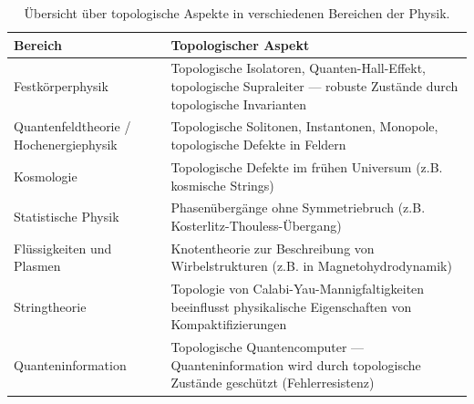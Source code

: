 \begin{table}[h]
    \centering
    \begin{tabular}{|l|p{10cm}|}
        \hline
        \textbf{Bereich} & \textbf{Topologischer Aspekt} \\
        \hline
        Festkörperphysik & Topologische Isolatoren, Quanten-Hall-Effekt, topologische Supraleiter — robuste Zustände durch topologische Invarianten \\
        \hline
        Quantenfeldtheorie / Hochenergiephysik & Topologische Solitonen, Instantonen, Monopole, topologische Defekte in Feldern \\
        \hline
        Kosmologie & Topologische Defekte im frühen Universum (z.B. kosmische Strings) \\
        \hline
        Statistische Physik & Phasenübergänge ohne Symmetriebruch (z.B. Kosterlitz-Thouless-Übergang) \\
        \hline
        Flüssigkeiten und Plasmen & Knotentheorie zur Beschreibung von Wirbelstrukturen (z.B. in Magnetohydrodynamik) \\
        \hline
        Stringtheorie & Topologie von Calabi-Yau-Mannigfaltigkeiten beeinflusst physikalische Eigenschaften von Kompaktifizierungen \\
        \hline
        Quanteninformation & Topologische Quantencomputer — Quanteninformation wird durch topologische Zustände geschützt (Fehlerresistenz) \\
        \hline
    \end{tabular}
    \caption{Übersicht über topologische Aspekte in verschiedenen Bereichen der Physik.}
    \label{tab:topologische_aspekte}
\end{table}
